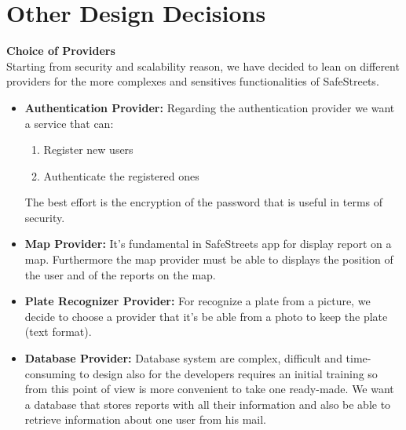 \documentclass[../RASD.tex]{subfiles}
\begin{document}
    \section{Other Design Decisions}\label{sec:other-design-decisions}
    \textbf{Choice of Providers} \\
    Starting from security and scalability reason, we have decided to lean on different providers for the more complexes and sensitives functionalities of SafeStreets.
    \begin{itemize}
        \item \textbf{Authentication Provider:} Regarding the authentication provider we want a service that can: \begin{enumerate}
                                                                                                                      \item Register new users
                                                                                                                      \item Authenticate the registered ones
        \end{enumerate}
        The best effort is the encryption of the password that is useful in terms of security.
        \item \textbf{Map Provider:} It's fundamental in SafeStreets app for display report on a map.
        Furthermore the map provider must be able to displays the position of the user and of the reports on the map.
        \item \textbf{Plate Recognizer Provider:} For recognize a plate from a picture, we decide to choose a provider that it’s be able from a photo
        to keep the plate (text format).
        \item \textbf{Database Provider:} Database system are complex, difficult and time-consuming to design also for the developers
        requires an initial training so from this point of view is more convenient to take one ready-made.
        We want a database that stores reports with all their information and also be able to retrieve information about one user from his mail.
    \end{itemize}
\end{document}
